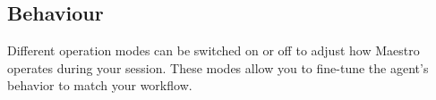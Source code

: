 \subsection*{Behaviour}

Different operation modes can be switched on or off to adjust how Maestro operates during your session. These modes allow you to fine-tune the agent's behavior to match your workflow.